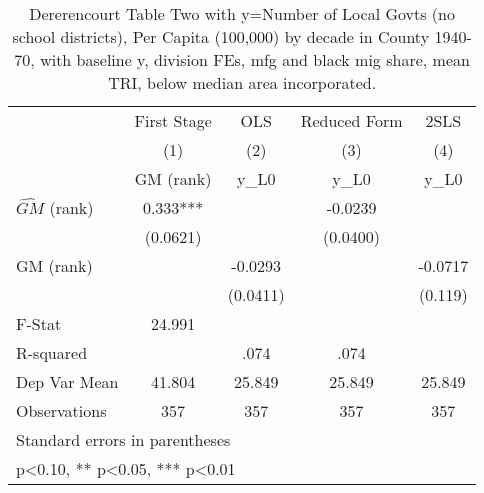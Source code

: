 \begin{table}[htbp]\centering
\def\sym#1{\ifmmode^{#1}\else\(^{#1}\)\fi}
\caption{Dererencourt Table Two with y=Number of Local Govts (no school districts), Per Capita (100,000) by decade in County 1940-70, with baseline y, division FEs, mfg and black mig share, mean TRI, below median area incorporated.}
\begin{tabular}{l*{4}{c}}
\toprule
                    & First Stage   &         OLS   &Reduced Form   &        2SLS   \\
                    &\multicolumn{1}{c}{(1)}&\multicolumn{1}{c}{(2)}&\multicolumn{1}{c}{(3)}&\multicolumn{1}{c}{(4)}\\
                    &\multicolumn{1}{c}{GM  (rank)}&\multicolumn{1}{c}{y\_L0}&\multicolumn{1}{c}{y\_L0}&\multicolumn{1}{c}{y\_L0}\\
\midrule
$\hat{GM}$ (rank)   &       0.333***&               &     -0.0239   &               \\
                    &    (0.0621)   &               &    (0.0400)   &               \\
\addlinespace
GM  (rank)          &               &     -0.0293   &               &     -0.0717   \\
                    &               &    (0.0411)   &               &     (0.119)   \\
\midrule
F-Stat              &      24.991   &               &               &               \\
R-squared           &               &        .074   &        .074   &               \\
Dep Var Mean        &      41.804   &      25.849   &      25.849   &      25.849   \\
Observations        &         357   &         357   &         357   &         357   \\
\bottomrule
\multicolumn{5}{l}{\footnotesize Standard errors in parentheses}\\
\multicolumn{5}{l}{\footnotesize * p<0.10, ** p<0.05, *** p<0.01}\\
\end{tabular}
\end{table}
